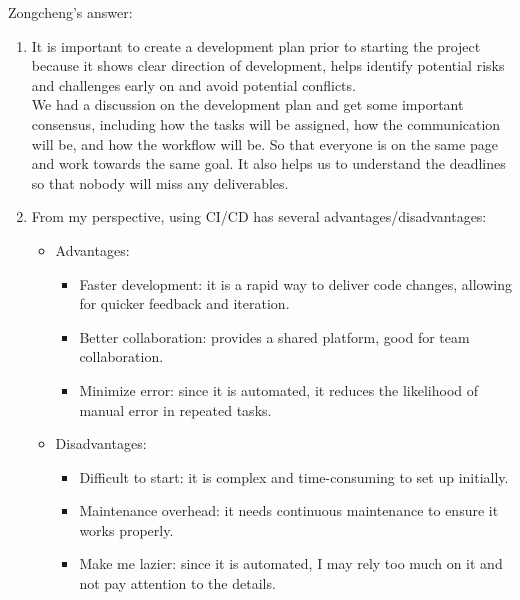 \documentclass{article}
\begin{document}
Zongcheng's answer:
\begin{enumerate}
  \item It is important to create a development plan prior to starting the project because it shows clear direction of development, 
helps identify potential risks and challenges early on and avoid potential conflicts. \\
We had a discussion on the development plan and 
get some important consensus, including how the tasks will be assigned, how the communication will be, and how the workflow will be.
So that everyone is on the same page and work towards the same goal. It also helps us to understand the deadlines so that nobody will 
miss any deliverables.
  \item From my perspective, using CI/CD has several advantages/disadvantages:
  \begin{itemize}
    \item Advantages:
      \begin{itemize}
        \item Faster development: it is a rapid way to deliver code changes, allowing for quicker feedback and iteration.
        \item Better collaboration: provides a shared platform, good for team collaboration.
        \item Minimize error: since it is automated, it reduces the likelihood of manual error in repeated tasks.
      \end{itemize}
    \item Disadvantages:
      \begin{itemize}
        \item Difficult to start: it is complex and time-consuming to set up initially.
        \item Maintenance overhead: it needs continuous maintenance to ensure it works properly.
        \item Make me  lazier: since it is automated, I may rely too much on it and not pay attention to the details.
      \end{itemize}
  \end{itemize}
\end{enumerate}
\end{document}
